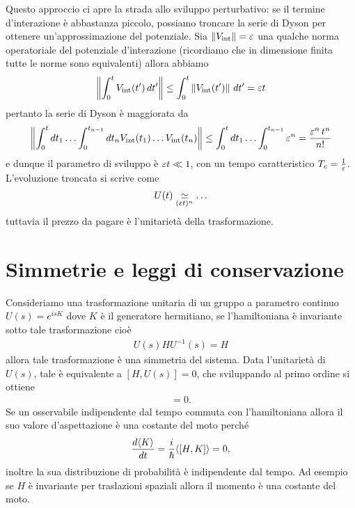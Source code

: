 Questo approccio ci apre la strada allo sviluppo perturbativo: se il termine d'interazione è abbastanza piccolo, possiamo troncare la serie di Dyson per 
ottenere un'approssimazione del potenziale. Sia $ \norm{V_{\text{int}}}  = \eps $ una qualche norma operatoriale del potenziale d'interazione 
(ricordiamo che in dimensione finita tutte le norme sono equivalenti) allora abbiamo
\begin{align*}
  \norm{\int_0^t V_{\text{int}}(t') \,dt'} \leq \int_0^t \norm{V_{\text{int}}(t')} \,dt' = \eps t
\end{align*}
pertanto la serie di Dyson è maggiorata da 
\begin{align*}
  \norm{\int_0^t dt_1 \ldots \int_0^{t_{n-1}} dt_n V_{\text{int}}(t_1) \ldots V_{\text{int}}(t_n)} \leq \int_0^t dt_1 \ldots \int_0^{t_{n-1}} \eps^n
  = \frac{\eps^n \, t^n}{n!}
\end{align*}
e dunque il parametro di sviluppo è $ \eps t \ll 1 $, con un tempo caratteristico $ T_c = \frac1\eps $. L'evoluzione troncata si scrive come 
\begin{align*}
  U(t) \un{\simeq}{(\eps t)^n} \ldots
\end{align*}
tuttavia il prezzo da pagare è l'unitarietà della trasformazione.

\section{Simmetrie e leggi di conservazione}
Consideriamo una trasformazione unitaria di un gruppo a parametro continuo $ U(s) = e^{i s K} $ dove $ K $ è il generatore hermitiano, se l'hamiltoniana 
è invariante sotto tale trasformazione cioè 
\begin{align*}
  U(s) H U^{-1}(s) = H
\end{align*}
allora tale trasformazione è una simmetria del sistema. Data l'unitarietà di $ U(s) $, tale è equivalente a $ [H, U(s)] = 0 $, che sviluppando al primo 
ordine si ottiene 
\begin{align*}
  [H, K] = 0.
\end{align*}
Se un osservabile indipendente dal tempo commuta con l'hamiltoniana allora il suo valore d'aspettazione è una costante del moto perché
\begin{align*}
  \frac{d\sc{K}}{dt} = \frac{i}\hbar \sc{[H, K]} = 0, 
\end{align*}
inoltre la sua distribuzione di probabilità è indipendente dal tempo. Ad esempio se $ H $ è invariante per traslazioni spaziali allora il momento è una 
costante del moto.

